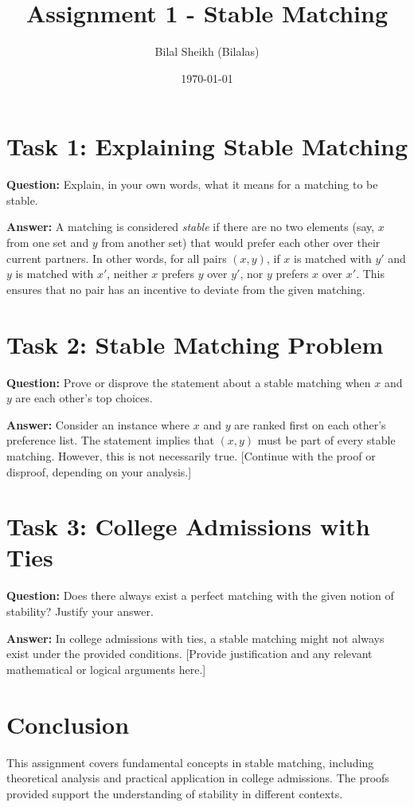 \documentclass{article}
\title{Assignment 1 - Stable Matching}
\author{Bilal Sheikh (Bilalas)}
\date{\today}
\begin{document}
\maketitle

\section*{Task 1: Explaining Stable Matching}

\textbf{Question:} Explain, in your own words, what it means for a matching to be stable.

\textbf{Answer:} 
A matching is considered \textit{stable} if there are no two elements (say, $x$ from one set and $y$ from another set) that would prefer each other over their current partners. In other words, for all pairs $(x, y)$, if $x$ is matched with $y'$ and $y$ is matched with $x'$, neither $x$ prefers $y$ over $y'$, nor $y$ prefers $x$ over $x'$. This ensures that no pair has an incentive to deviate from the given matching.

\section*{Task 2: Stable Matching Problem}

\textbf{Question:} Prove or disprove the statement about a stable matching when $x$ and $y$ are each other's top choices.

\textbf{Answer:} 
Consider an instance where $x$ and $y$ are ranked first on each other's preference list. The statement implies that $(x, y)$ must be part of every stable matching. However, this is not necessarily true. [Continue with the proof or disproof, depending on your analysis.]

\section*{Task 3: College Admissions with Ties}

\textbf{Question:} Does there always exist a perfect matching with the given notion of stability? Justify your answer.

\textbf{Answer:} 
In college admissions with ties, a stable matching might not always exist under the provided conditions. [Provide justification and any relevant mathematical or logical arguments here.]

\section*{Conclusion}

This assignment covers fundamental concepts in stable matching, including theoretical analysis and practical application in college admissions. The proofs provided support the understanding of stability in different contexts.
\end{document}
